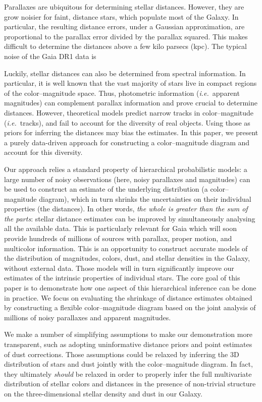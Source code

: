 \documentclass[manuscript, letterpaper]{aastex6}
\newcommand{\ie}{{\textit{i.e.}~}}
\begin{document}
Parallaxes are ubiquitous for determining stellar distances.
However, they are grow noisier for faint, distance stars, which populate most of the Galaxy. 
In particular, the resulting distance errors, under a Gaussian approximation, are proportional to the parallax error divided by the parallax squared.
This makes difficult to determine the distances above a few kilo parsecs (kpc). 
The typical noise of the Gaia DR1 data is

Luckily, stellar distances can also be determined from spectral information.
In particular, it is well known that the vast majority of stars live in compact regions of the color--magnitude space.
Thus, photometric information (\ie apparent magnitudes) can complement parallax information and prove crucial to determine distances.
However, theoretical models predict narrow tracks in color--magnitude (\ie tracks), and fail to account for the diversity of real objects.
Using those as priors for inferring the distances may bias the estimates.
In this paper, we present a purely data-driven approach for constructing a color--magnitude diagram and account for this diversity. 

Our approach relies a standard property of hierarchical probabilistic models: a large number of noisy observations (here, noisy parallaxes and magnitudes) can be used to construct an estimate of the underlying distribution (a color--magnitude diagram), which in turn shrinks the uncertainties on their individual properties (the distances).
In other words, \textit{the whole is greater than the sum of the parts}: stellar distance estimates can be improved by simultaneously analysing all the available data.
This is particularly relevant for Gaia which will soon provide hundreds of millions of sources with parallax, proper motion, and multicolor information.
This is an opportunity to construct accurate models of the distribution of magnitudes, colors, dust, and stellar densities in the Galaxy, without external data. 
Those models will in turn significantly improve our estimates of the intrinsic properties of individual stars.
The core goal of this paper is to demonstrate how one aspect of this hierarchical inference can be done in practice. 
We focus on evaluating the shrinkage of distance estimates obtained by constructing a flexible color--magnitude diagram based on the joint analysis of millions of noisy parallaxes and apparent magnitudes.

We make a number of simplifying assumptions to make our demonstration more transparent, such as adopting uninformative distance priors and point estimates of dust corrections. 
Those assumptions could be relaxed by inferring the 3D distribution of stars and dust jointly with the color--magnitude diagram.
In fact, they ultimately \emph{should} be relaxed in order to properly infer the full multivariate distribution of stellar colors and distances in the presence of non-trivial structure on the three-dimensional stellar density and dust in our Galaxy.
\end{document}
